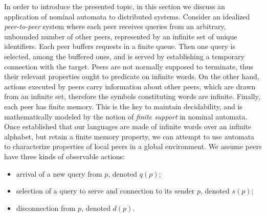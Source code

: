 
In order to introduce the presented topic, in this section we discuss an application of nominal automata to distributed systems. Consider an idealized \emph{peer-to-peer} system where each peer receives queries from an arbitrary, unbounded number of other peers, represented by an infinite set of unique identifiers. Each peer buffers requests in a finite queue. Then one query is selected, among the buffered ones, and is served by establishing a temporary connection with the target. Peers are not normally supposed to terminate, thus their relevant properties ought to predicate on infinite words. On the other hand, actions executed by peers carry information about other peers, which are drawn from an infinite set, therefore the symbols constituting words are infinite. Finally, each peer has finite memory. This is the key to maintain decidability, and is mathematically modeled by the notion of \emph{finite support} in nominal automata. Once established that our languages are made of infinite words over an infinite alphabet, but retain a finite memory property, we can attempt to use automata to characterize properties of local peers in a global environment. 
We assume peers have three kinds of observable actions: 
\begin{itemize}
	\item arrival of a new query from $p$, denoted $q(p)$; 
	\item selection of a query to serve and connection to its sender $p$, denoted $s(p)$; 
	\item disconnection from $p$, denoted $d(p)$.
\end{itemize}
%


